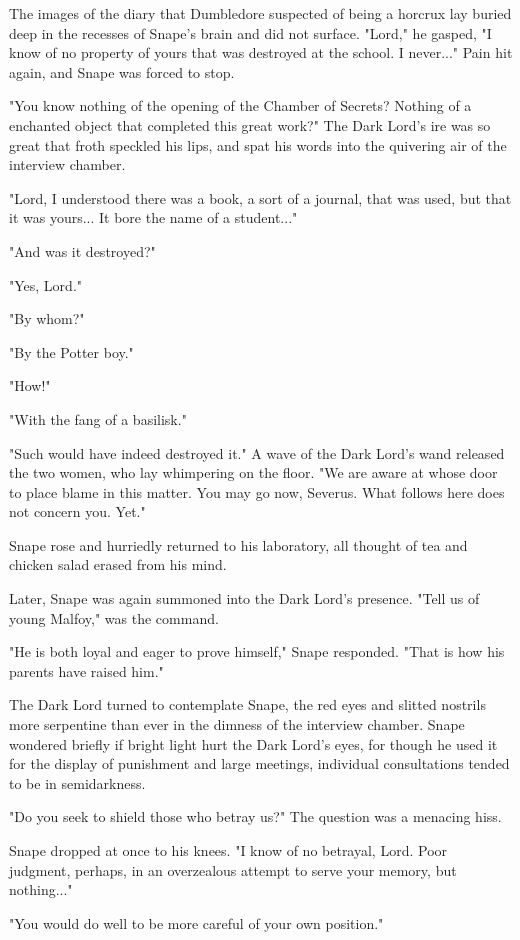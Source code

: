 \documentclass[a4paper,11pt]{article}
\begin{document}
The images of the diary that Dumbledore suspected of being a horcrux lay buried deep in the recesses of Snape's brain and did not surface. "Lord," he gasped, "I know of no property of yours that was destroyed at the school. I never..." Pain hit again, and Snape was forced to stop.

"You know nothing of the opening of the Chamber of Secrets? Nothing of a enchanted object that completed this great work?" The Dark Lord's ire was so great that froth speckled his lips, and spat his words into the quivering air of the interview chamber.

"Lord, I understood there was a book, a sort of a journal, that was used, but that it was yours... It bore the name of a student..."

"And was it destroyed?"

"Yes, Lord."

"By whom?"

"By the Potter boy."

"How!"

"With the fang of a basilisk."

"Such would have indeed destroyed it." A wave of the Dark Lord's wand released the two women, who lay whimpering on the floor. "We are aware at whose door to place blame in this matter. You may go now, Severus. What follows here does not concern you. Yet."

Snape rose and hurriedly returned to his laboratory, all thought of tea and chicken salad erased from his mind.

Later, Snape was again summoned into the Dark Lord's presence. "Tell us of young Malfoy," was the command.

"He is both loyal and eager to prove himself," Snape responded. "That is how his parents have raised him."

The Dark Lord turned to contemplate Snape, the red eyes and slitted nostrils more serpentine than ever in the dimness of the interview chamber. Snape wondered briefly if bright light hurt the Dark Lord's eyes, for though he used it for the display of punishment and large meetings, individual consultations tended to be in semidarkness.

"Do you seek to shield those who betray us?" The question was a menacing hiss.

Snape dropped at once to his knees. "I know of no betrayal, Lord. Poor judgment, perhaps, in an overzealous attempt to serve your memory, but nothing..."

"You would do well to be more careful of your own position."
\end{document}
